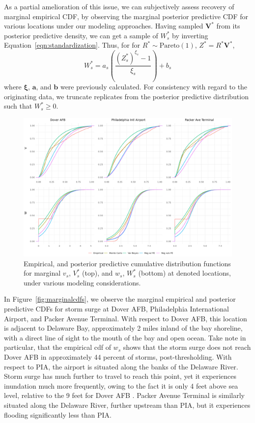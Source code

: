 As a partial amelioration of this issue, we can subjectively assess recovery of marginal 
    empirical CDF, by observing the marginal posterior predictive CDF for various locations
    under our modeling approaches. Having sampled $\bm{V}^{*}$ from its posterior predictive 
    density, we can get a sample of $W_s^*$ by inverting Equation~\eqref{eqn:standardization}.  
    Thus, for for $R^*\sim\text{Pareto}(1)$, $Z^* = R^*\bm{V}^*$,
    \begin{equation*}
        W_s^* = a_s\left(\frac{(Z_s^*)^{\xi_s} - 1}{\xi_s}\right) + b_s
    \end{equation*}
    where $\bm{\xi}$, $\bm{a}$, and $\bm{b}$ were previously calculated.  
    For consistency with regard to the originating data, we truncate replicates from the 
    posterior predictive distribution such that $W_{s}^* \geq 0$.
    
\begin{figure}[ht]
    \centering
    \includegraphics[width=0.95\linewidth]{./plots/delaware_marginal_cdfs.png}
    \caption{Empirical, and posterior predictive cumulative distribution functions for
        marginal $v_s$, $V_s^*$ (top), and $w_s$, $W_s^*$ (bottom) at denoted locations, under
        various modeling considerations.\label{plot:marginalcdfs}}
\end{figure}

In Figure~\ref{fig:marginalcdfs}, we observe the marginal empirical and posterior predictive
    CDFs for storm surge at Dover AFB, Philadelphia International Airport, and Packer Avenue Terminal.
    With respect to Dover AFB, this location is adjacent to Delaware Bay, approximately 2 miles inland
    of the bay shoreline, with a direct line of sight to the mouth of the bay and open ocean.  Take
    note in particular, that the empirical cdf of $w_s$ shows that the storm surge does not reach
    Dover AFB in approximately \num{44} percent of storms, post-thresholding.  With respect to PIA,
    the airport is situated along the banks of the Delaware River.  Storm surge has much further to
    travel to reach this point, yet it experiences inundation much more frequently, owing to the fact
    it is only 4 feet above sea level, relative to the 9 feet for Dover AFB \makenote{[Confirm]}.  
    Packer Avenue Terminal is similarly situated along the Delaware River, further upstream than PIA,
    but it experiences flooding significantly less than PIA.

